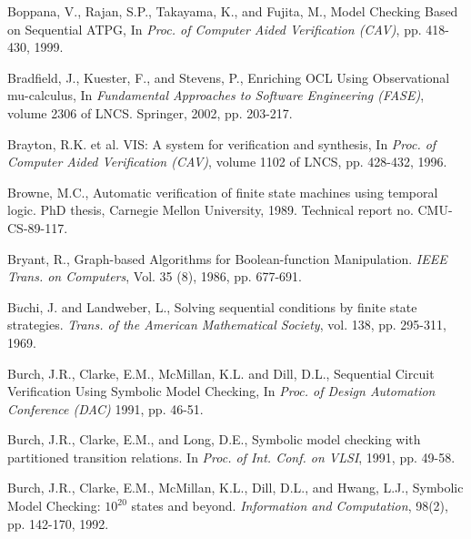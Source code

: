 {\begin{thebibliography}{99}
 Boppana, V., Rajan, S.P., Takayama, K., and Fujita, M.,
        Model Checking Based on Sequential ATPG, In {\em Proc. of Computer 
	Aided Verification (CAV)}, pp. 418-430, 1999.

 Bradfield, J., Kuester, F., and Stevens, P., Enriching
    OCL Using Observational mu-calculus, In {\em Fundamental Approaches 
    to Software Engineering (FASE)}, volume 2306 of LNCS. Springer,
    2002, pp. 203-217.

 Brayton, R.K. et al. VIS: A system for verification
        and synthesis, In {\em Proc. of Computer Aided Verification
    (CAV)}, volume 1102 of LNCS, pp. 428-432, 1996.

 Browne, M.C., Automatic verification of finite state
    machines using temporal logic. PhD thesis, Carnegie Mellon University,
1989. Technical report no. CMU-CS-89-117. 

 Bryant, R., Graph-based Algorithms for Boolean-function
	Manipulation. {\em IEEE Trans. on Computers}, Vol. 35 (8), 1986, 
	pp. 677-691.

 B$\ddot{u}$chi, J. and Landweber, L., 
	Solving sequential conditions
	by finite state strategies. {\em Trans. of the American Mathematical
	Society}, vol. 138, pp. 295-311, 1969.

 Burch, J.R., Clarke, E.M., McMillan, K.L. and Dill, D.L., 
	Sequential Circuit Verification Using Symbolic Model Checking, 
	In {\em Proc. of Design Automation Conference (DAC)} 1991, 
	pp. 46-51.


 Burch, J.R., Clarke, E.M., and Long, D.E., Symbolic
	model checking with partitioned transition relations. In {\em
	Proc. of Int. Conf. on VLSI}, 1991, pp. 49-58.

 Burch, J.R., Clarke, E.M., McMillan, K.L., Dill, D.L.,
	and Hwang, L.J., Symbolic Model Checking: $10^{20}$ states and
	beyond. {\em Information and Computation}, 98(2), pp. 142-170, 1992.



\end{thebibliography}}
